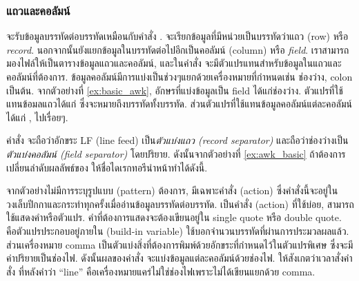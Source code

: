 \begin{thwbr}
\subsubsection{แถวและคอลัมน์}
\begin{figure}[!htb]
\end{figure}

 จะรับข้อมูลบรรทัดต่อบรรทัดเหมือนกับคำสั่ง .  จะเรียกข้อมูลที่มีหน่วยเป็นบรรทัดว่าแถว (row) หรือ \emph{record}. นอกจากนั้นยังแยกข้อมูลในบรรทัดต่อไปอีกเป็นคอลัมน์ (column) หรือ \emph{field}. เราสามารถมองไฟล์ให้เป็นตารางข้อมูลแถวและคอลัมน์, และในคำสั่ง  จะมีตัวแปรแทนสำหรับข้อมูลในแถวและคอลัมน์ที่ต้องการ. ข้อมูลคอลัมน์มีการแบ่งเป็นช่วงๆแยกด้วยเครื่องหมายที่กำหนดเช่น ช่องว่าง, colon เป็นต้น. จากตัวอย่างที่ \ref{ex:basic_awk}, อักษรที่แบ่งข้อมูลเป็น field ได้แก่ช่องว่าง. ตัวแปรที่ใช้แทนข้อมลแถวได้แก่  ซึ่งจะหมายถึงบรรทัดทั้งบรรทัด. ส่วนตัวแปรที่ใช้แทนข้อมูลคอลัมน์แต่ละคอลัมน์ได้แก่ ,  ไปเรื่อยๆ. 

คำสั่ง  จะถือว่าอักขระ LF (line feed) เป็น\emph{ตัวแบ่งแถว (record separator)} และถือว่าช่องว่างเป็น\emph{ตัวแบ่งคอลัมน์ (field separator)} โดยปริยาย. ดังนั้นจากตัวอย่างที่ \ref{ex:awk_basic} ถ้าต้องการเปลี่ยนลำดับผลลัพธ์ของ  ให้ชื่อไดเรกทอรีนำหน้าทำได้ดังนี้.
\begin{MyExample}
\end{MyExample}%

จากตัวอย่างไม่มีการระบุรูปแบบ (pattern) ต้องการ, มีเฉพาะคำสั่ง (action) ซึ่งคำสั่งนี้จะอยู่ในวงเล็บปีกกาและกระทำทุกครั้งเมื่ออ่านข้อมูลบรรทัดต่อบรรทัด.  เป็นคำสั่ง (action) ที่ใช้บ่อย, สามารถใช้แสดงคำหรือตัวแปร. คำที่ต้องการแสดงจะต้องเขียนอยู่ใน single quote หรือ double quote.  คือตัวแปรประกอบอยู่ภายใน (build-in variable) ใช้บอกจำนวนบรรทัดที่ผ่านการประมวลผลแล้ว. ส่วนเครื่องหมาย comma เป็นตัวแบ่งสิ่งที่ต้องการพิมพ์ด้วยอักขระที่กำหนดไว้ในตัวแปรพิเศษ  ซึ่งจะมีค่าปริยายเป็นช่องไฟ. ดังนั้นผลของคำสั่ง  จะแบ่งข้อมูลแต่ละคอลัมน์ด้วยช่องไฟ. ให้สังเกตว่าเวลาสั่งคำสั่ง  ที่หลังคำว่า ``line'' คือเครื่องหมายแคร่ไม่ใช่ช่องไฟเพราะไม่ได้เขียนแยกด้วย comma.


\end{thwbr}
